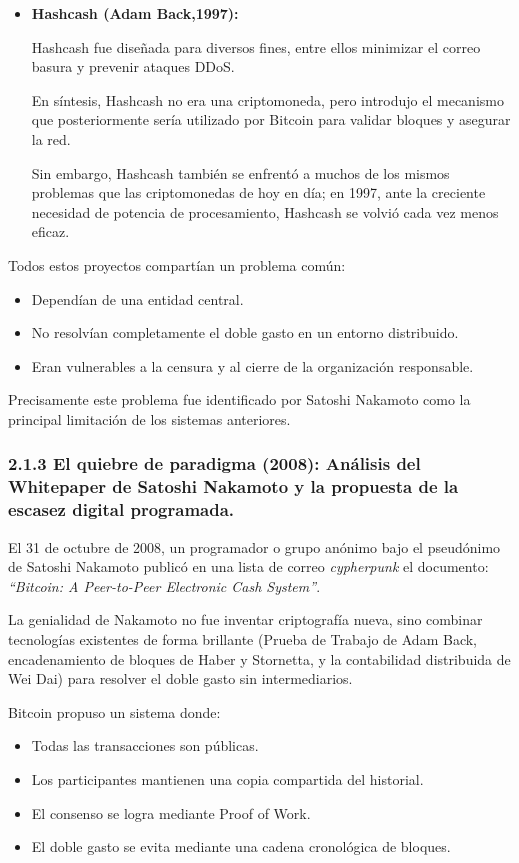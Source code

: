 \documentclass[12pt,a4paper]{article}
\begin{document}
\begin{itemize}
  \item \textbf{Hashcash (Adam Back,1997):}

        Hashcash fue diseñada para diversos fines, entre ellos minimizar el correo basura y
        prevenir ataques DDoS.

        En síntesis, Hashcash no era una criptomoneda, pero introdujo el mecanismo que
        posteriormente sería utilizado por Bitcoin para validar bloques y asegurar la red.

        Sin embargo, Hashcash también se enfrentó a muchos de los mismos problemas
        que las criptomonedas de hoy en día; en 1997, ante la creciente necesidad de
        potencia de procesamiento, Hashcash se volvió cada vez menos eficaz.
\end{itemize}

Todos estos proyectos compartían un problema común:

\begin{itemize}
  \item Dependían de una entidad central.
  \item No resolvían completamente el doble gasto en un entorno distribuido.
  \item Eran vulnerables a la censura y al cierre de la organización responsable.
\end{itemize}

Precisamente este problema fue identificado por Satoshi Nakamoto como la principal
limitación de los sistemas anteriores.

\subsubsection*{2.1.3 El quiebre de paradigma (2008): Análisis del Whitepaper de Satoshi Nakamoto y la propuesta de la escasez digital programada.}


El 31 de octubre de 2008, un programador o grupo anónimo bajo el pseudónimo de Satoshi
Nakamoto publicó en una lista de correo \textit{cypherpunk} el documento: \textit{``Bitcoin: A Peer-to-Peer
Electronic Cash System''}.

La genialidad de Nakamoto no fue inventar criptografía nueva, sino combinar tecnologías
existentes de forma brillante (Prueba de Trabajo de Adam Back, encadenamiento de
bloques de Haber y Stornetta, y la contabilidad distribuida de Wei Dai) para resolver el doble
gasto sin intermediarios.

Bitcoin propuso un sistema donde:

\begin{itemize}
  \item Todas las transacciones son públicas.
  \item Los participantes mantienen una copia compartida del historial.
  \item El consenso se logra mediante Proof of Work.
  \item El doble gasto se evita mediante una cadena cronológica de bloques.
\end{itemize}
\end{document}
